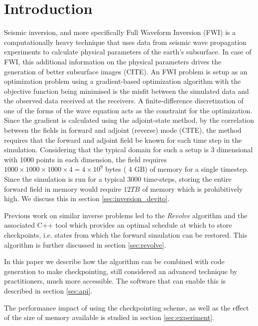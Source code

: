\documentclass[sigconf]{acmart}
\begin{document}
\maketitle

\section{Introduction}
Seismic inversion, and more specifically Full Waveform Inversion (FWI)
is a computationally heavy technique that uses data from seismic wave
propagation experiments to calculate physical parameters of the
earth's subsurface. In case of FWI, this additional information on the
physical parameters drives the generation of better subsurface
images (CITE). An FWI problem is setup as an optimization problem using
a gradient-based optimization algorithm with the objective function
being minimised is the misfit between the simulated data and the
observed data received at the receivers. A finite-difference
discretization of one of the forms of the wave equation acts as the
constraint for the optimization. Since the gradient is calculated using the
adjoint-state method, by the correlation between the fields in forward
and adjoint (reverse) mode (CITE), the method requires that the forward and
adjoint field be known for each time step in the
simulation. Considering that the typical domain for such a setup is 3
dimensional with 1000 points in each dimension, the field requires
$1000 \times 1000 \times 1000 \times 4 = 4 \times 10^{9} $ bytes ( 4
GB) of memory for a single timestep. Since the simulation is run for a
typical $3000$ time-steps, storing the entire forward field in memory
would require $12 TB$ of memory which is prohibitively high. We
discuss this in section \ref{sec:inversion_devito}. 

Previous work on similar inverse problems led to the \emph{Revolve}
algorithm \cite{griewank2000} and the associated C++ tool which
provides an optimal schedule at which to store checkpoints,
i.e. states from which the forward simulation can be restored. This
algorithm is further discussed in section \ref{sec:revolve}.

In this paper we describe how the algorithm can be combined with code
generation to make checkpointing, still considered an advanced
technique by practitioners, much more accessible. The software that
can enable this is described in section \ref{sec:api}. 

The performance impact of using the checkpointing scheme, as well as
the effect of the size of memory available is studied in section
\ref{sec:experiment}. 
\end{document}
